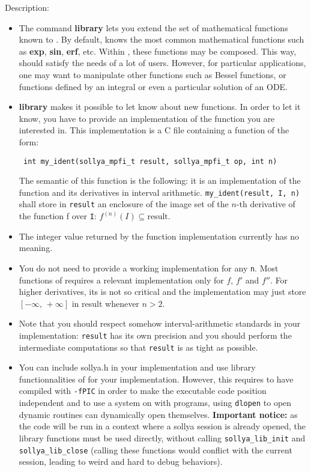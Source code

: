 \noindent Description: \begin{itemize}

\item The command \textbf{library} lets you extend the set of mathematical
   functions known to \sollya.
   By default, \sollya knows the most common mathematical functions such
   as \textbf{exp}, \textbf{sin}, \textbf{erf}, etc. Within \sollya, these functions may be
   composed. This way, \sollya should satisfy the needs of a lot of
   users. However, for particular applications, one may want to
   manipulate other functions such as Bessel functions, or functions
   defined by an integral or even a particular solution of an ODE.

\item \textbf{library} makes it possible to let \sollya know about new functions. In
   order to let it know, you have to provide an implementation of the
   function you are interested in. This implementation is a C file containing
   a function of the form:
   \begin{verbatim} int my_ident(sollya_mpfi_t result, sollya_mpfi_t op, int n)\end{verbatim}
   The semantic of this function is the following: it is an implementation of
   the function and its derivatives in interval arithmetic.
   \verb|my_ident(result, I, n)| shall store in \verb|result| an enclosure 
   of the image set of the $n$-th derivative
   of the function f over \verb|I|: $f^{(n)}(I) \subseteq \mathrm{result}$.

\item The integer value returned by the function implementation currently has no
   meaning.

\item You do not need to provide a working implementation for any \verb|n|. Most
   functions of \sollya requires a relevant implementation only for $f$,
   $f'$ and $f''$. For higher derivatives, its is not so critical and the
   implementation may just store $[-\infty,\,+\infty]$ in result whenever $n>2$.

\item Note that you should respect somehow interval-arithmetic standards in your
   implementation: \verb|result| has its own precision and you should perform the 
   intermediate computations so that \verb|result| is as tight as possible.

\item You can include sollya.h in your implementation and use library 
   functionnalities of \sollya for your implementation. However, this requires to
   have compiled \sollya with \texttt{-fPIC} in order to make the \sollya executable code
   position independent and to use a system on with programs, using \texttt{dlopen} to
   open dynamic routines can dynamically open themselves. \textbf{Important notice:} as
   the code will be run in a context where a sollya session is already opened,
   the library functions must be used directly, without calling \verb|sollya_lib_init|
   and \verb|sollya_lib_close| (calling these functions would conflict with the
   current session, leading to weird and hard to debug behaviors).


\end{itemize}

